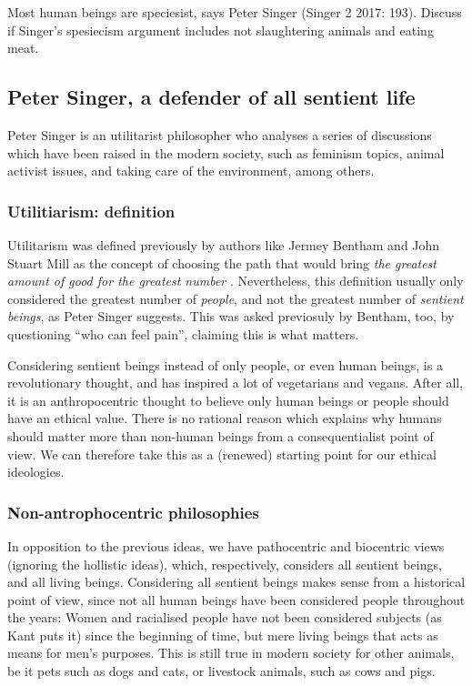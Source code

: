 \documentclass{myassignment}
\newcommand{\q}[1]{``#1''}
\begin{document}
	\begin{problem}
		Most human beings are speciesist, says Peter Singer (Singer 2 2017: 193). Discuss if Singer’s spesiecism argument includes not slaughtering animals and eating meat.%
	\end{problem}%
	\begin{answer}
		\section*{Peter Singer, a defender of all sentient life}%
		
		Peter Singer is an utilitarist philosopher who analyses a series of discussions which have been raised in the modern society, such as feminism topics, animal activist issues, and taking care of the environment, among others.

		\subsubsection*{Utilitiarism: definition}%
		
		Utilitarism was defined previously by authors like Jermey Bentham and John Stuart Mill as the concept of choosing the path that would bring \emph{the greatest amount of good for the greatest number} \autocite{definitionutilitarism}. Nevertheless, this definition usually only considered the greatest number of \emph{people}, and not the greatest number of \emph{sentient beings}, as Peter Singer suggests. This was asked previosuly by Bentham, too, by questioning \q{who can feel pain}, claiming this is what matters.

		Considering sentient beings instead of only people, or even human beings, is a revolutionary thought, and has inspired a lot of vegetarians and vegans. After all, it is an anthropocentric thought to believe only human beings or people should have an ethical value. There is no rational reason which explains why humans should matter more than non-human beings from a consequentialist point of view. We can therefore take this as a (renewed) starting point for our ethical ideologies.

		\subsubsection*{Non-antrophocentric philosophies}%
		
		In opposition to the previous ideas, we have pathocentric and biocentric views (ignoring the hollistic ideas), which, respectively, considers all sentient beings, and all living beings. Considering all sentient beings makes sense from a historical point of view, since not all human beings have been considered people throughout the years: Women and racialised people have not been considered subjects (as Kant puts it) since the beginning of time, but mere living beings that acts as means for men's purposes. This is still true in modern society for other animals, be it pets such as dogs and cats, or livestock animals, such as cows and pigs. 


\end{answer}
\end{document}
